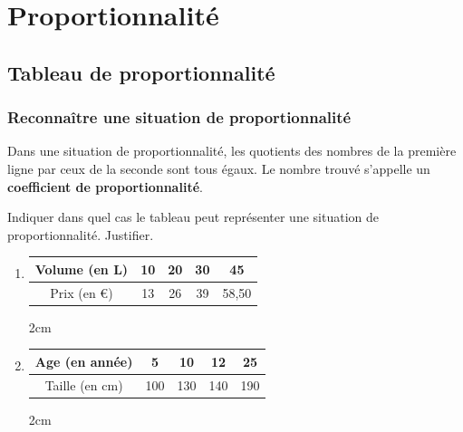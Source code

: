 \documentclass[a4paper]{book}
\begin{document}
\setcounter{chapter}{9}
\renewcommand{\monTitre}{Proportionnalité}
\chapter{\monTitre}
\thispagestyle{fancy} 

\section{Tableau de proportionnalité}
\subsection{Reconnaître une situation de proportionnalité}
    
    \begin{propriete} 
        Dans une situation de proportionnalité, les quotients des nombres de la première ligne par ceux de la seconde sont tous égaux. Le nombre trouvé s'appelle un \textbf{coefficient de proportionnalité}.
    \end{propriete}
    
    \begin{exemple} 
        Indiquer dans quel cas le tableau peut représenter une situation de proportionnalité. Justifier.

        \begin{enumerate}[leftmargin=*]
            \item \begin{tabular}{|c|c|c|c|c|}
                \hline
                Volume (en L) & 10 & 20 & 30 & 45 \\ \hline
                Prix (en €) & 13 & 26 & 39 & 58,50 \\ \hline
            \end{tabular}

            \begin{ZoneReponse}{2cm}
            \end{ZoneReponse}
            
            \item \begin{tabular}{|c|c|c|c|c|}
                \hline
                Age (en année) & 5 & 10 & 12 & 25 \\ \hline
                Taille (en cm) & 100 & 130 & 140 & 190 \\ \hline
            \end{tabular}

            \begin{ZoneReponse}{2cm}
            \end{ZoneReponse}
        \end{enumerate}
    \end{exemple}
\end{document}
